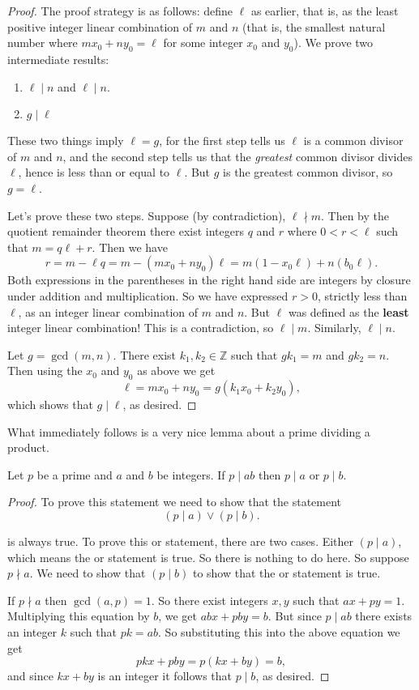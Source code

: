 \begin{proof}
The proof strategy is as follows: define $\ell$ as earlier, that is, as the least positive integer linear combination of $m$ and $n$ (that is, the smallest natural number where $mx_0 + ny_0 = \ell$ for some integer $x_0$ and $y_0$). We prove two intermediate results:
\begin{enumerate}
    \item $\ell \mid n$ and $\ell \mid n$.
    \item $g \mid \ell$
\end{enumerate}

These two things imply $\ell = g$, for the first step tells us $\ell$ is a common divisor of $m$ and $n$, and the second step tells us that the \textit{greatest} common divisor divides $\ell$, hence is less than or equal to $\ell$. But $g$ is the greatest common divisor, so $g = \ell$.

Let's prove these two steps. Suppose (by contradiction), $\ell \nmid m$. Then by the quotient remainder theorem there exist integers $q$ and $r$ where $0 < r < \ell$ such that $m = q\ell + r$. Then we have
\[r = m - \ell q = m - (mx_0 + ny_0)\ell = m(1 - x_0\ell) + n(b_0\ell).\]
Both expressions in the parentheses in the right hand side are integers by closure under addition and multiplication. So we have expressed $r > 0$, strictly less than $\ell$, as an integer linear combination of $m$ and $n$. But $\ell$ was defined as the \textbf{least} integer linear combination! This is a contradiction, so $\ell \mid m$. Similarly, $\ell \mid n$.

Let $g = \gcd(m, n)$. There exist $k_1, k_2 \in \mathbb{Z}$ such that $gk_1 = m$ and $gk_2 = n$. Then using the $x_0$ and $y_0$ as above we get
\[\ell = mx_0 + ny_0 = g(k_1x_0 + k_2y_0),\]
which shows that $g \mid \ell$, as desired.
\end{proof}

What immediately follows is a very nice lemma about a prime dividing a product.

\begin{lemma}
    Let $p$ be a prime and $a$ and $b$ be integers. If $p \mid ab$ then $p \mid a$ or $p \mid b$.
\end{lemma}
\begin{proof}
    To prove this statement we need to show that the statement
    \[(p \mid a) \lor (p \mid b).\]
    
    is always true. To prove this or statement, there are two cases. Either $(p \mid a)$, which means the or statement is true. So there is nothing to do here. So suppose $p \nmid a$. We need to show that $(p \mid b)$ to show that the or statement is true.
    
    If $p \nmid a$ then $\gcd(a, p) = 1$. So there exist integers $x, y$ such that $ax + py = 1$. Multiplying this equation by $b$, we get $abx + pby = b$. But since $p \mid ab$ there exists an integer $k$ such that $pk = ab$. So substituting this into the above equation we get
    \[pkx + pby = p(kx + by) = b,\] and since $kx + by$ is an integer it follows that $p \mid b$, as desired.
\end{proof}

